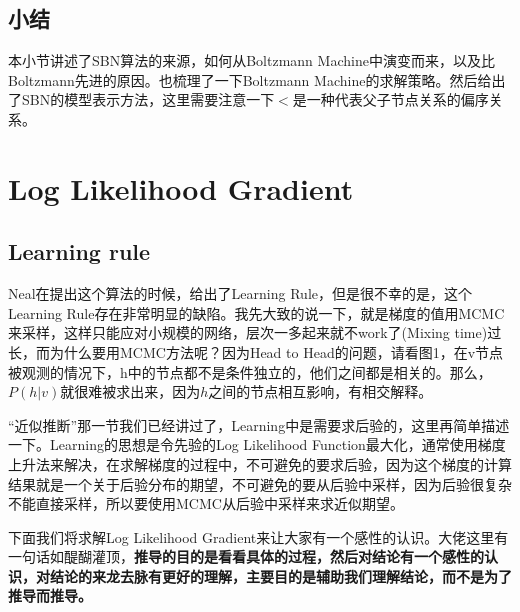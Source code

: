 \documentclass[a4paper]{article}
\begin{document}
\subsection{小结}
本小节讲述了SBN算法的来源，如何从Boltzmann Machine中演变而来，以及比Boltzmann先进的原因。也梳理了一下Boltzmann Machine的求解策略。然后给出了SBN的模型表示方法，这里需要注意一下$<$是一种代表父子节点关系的偏序关系。
\section{Log Likelihood Gradient}
\subsection{Learning rule}
Neal在提出这个算法的时候，给出了Learning Rule，但是很不幸的是，这个Learning Rule存在非常明显的缺陷。我先大致的说一下，就是梯度的值用MCMC来采样，这样只能应对小规模的网络，层次一多起来就不work了(Mixing time)过长，而为什么要用MCMC方法呢？因为Head to Head的问题，请看图1，在v节点被观测的情况下，h中的节点都不是条件独立的，他们之间都是相关的。那么，$P(h|v)$就很难被求出来，因为$h$之间的节点相互影响，有相交解释。

“近似推断”那一节我们已经讲过了，Learning中是需要求后验的，这里再简单描述一下。Learning的思想是令先验的Log Likelihood Function最大化，通常使用梯度上升法来解决，在求解梯度的过程中，不可避免的要求后验，因为这个梯度的计算结果就是一个关于后验分布的期望，不可避免的要从后验中采样，因为后验很复杂不能直接采样，所以要使用MCMC从后验中采样来求近似期望。

下面我们将求解Log Likelihood Gradient来让大家有一个感性的认识。大佬这里有一句话如醍醐灌顶，\textbf{推导的目的是看看具体的过程，然后对结论有一个感性的认识，对结论的来龙去脉有更好的理解，主要目的是辅助我们理解结论，而不是为了推导而推导。}
\end{document}
